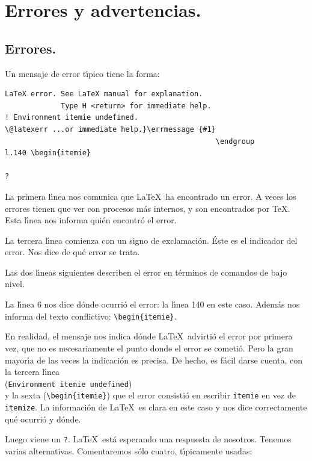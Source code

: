 \section{Errores y advertencias.}

\subsection{Errores.}

Un mensaje de error t{\'\i}pico tiene la forma:\label{itemie}
\begin{verbatim}
LaTeX error. See LaTeX manual for explanation.
             Type H <return> for immediate help.
! Environment itemie undefined.
\@latexerr ...or immediate help.}\errmessage {#1}
                                                 \endgroup
l.140 \begin{itemie}

?  
\end{verbatim}


La primera l{\'\i}nea nos comunica que \LaTeX\ ha encontrado un
error. A veces los errores tienen que ver con  procesos m{\'a}s
internos, y son encontrados por \TeX. Esta l{\'\i}nea nos informa
qui{\'e}n encontr{\'o} el error. 

La tercera l{\'\i}nea comienza con un signo de exclamaci{\'o}n. {\'E}ste
es el indicador del error. Nos dice de qu{\'e} error se trata.

Las dos l{\'\i}neas siguientes describen el error en t{\'e}rminos de
comandos de bajo nivel.

La l{\'\i}nea 6 nos dice d{\'o}nde ocurri{\'o} el error: la l{\'\i}nea
140 en este caso. Adem{\'a}s nos informa del texto conflictivo:
\verb+\begin{itemie}+.
  
  En realidad, el mensaje nos indica d{\'o}nde \LaTeX\ advirti{\'o} el error
  por primera vez, que no es necesariamente el punto donde el error se
  cometi{\'o}. Pero la gran mayor{\'\i}a de las veces la indicaci{\'o}n es
  precisa. De hecho, es f{\'a}cil darse cuenta, con la tercera l{\'\i}nea\\
  (\verb+Environment itemie undefined+)\\ y la sexta
  (\verb+\begin{itemie}+) que el error consisti{\'o} en escribir
    \verb+itemie+ en vez de \verb+itemize+. La informaci{\'o}n de \LaTeX\ 
    es clara en este caso y nos dice correctamente qu{\'e} ocurri{\'o} y
    d{\'o}nde.

Luego viene un \verb+?+. \LaTeX\ est{\'a} esperando una respuesta de
nosotros. Tenemos varias alternativas. Comentaremos s{\'o}lo cuatro,
t{\'\i}picamente usadas:

